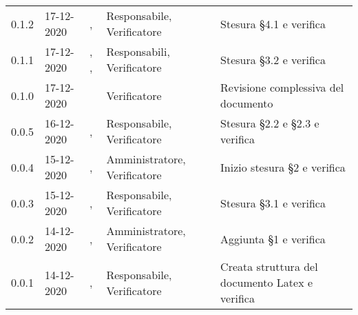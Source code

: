 {{\begin{longtable}{C{1.7cm} C{2.2cm} C{3.2cm} C{3cm} C{4.8cm}}
0.1.2 & 17-12-2020 & \SG{}, \ZM{} & Responsabile, Verificatore & Stesura \S 4.1 e verifica\\

0.1.1 & 17-12-2020 & \SG{}, \BM{}, \SH{} & Responsabili, Verificatore & Stesura \S 3.2 e verifica \\

0.1.0 & 17-12-2020 & \ZM{} & Verificatore & Revisione complessiva del documento \\

0.0.5 & 16-12-2020 & \BM{}, \SH{} & Responsabile, Verificatore & Stesura \S 2.2 e \S 2.3 e verifica \\
		
0.0.4 & 15-12-2020 & \PA{}, \SH{} & Amministratore, Verificatore & Inizio stesura \S 2 e verifica \\

0.0.3 & 15-12-2020 & \SG{}, \ZM{} & Responsabile, Verificatore & Stesura \S 3.1 e verifica \\

0.0.2 & 14-12-2020 & \PA{}, \ZM{} & Amministratore, Verificatore & Aggiunta \S 1 e verifica \\

0.0.1 & 14-12-2020 & \SG{}, \ZM{} & Responsabile, Verificatore & Creata struttura del documento Latex e verifica \\
		
\end{longtable}
}
}
